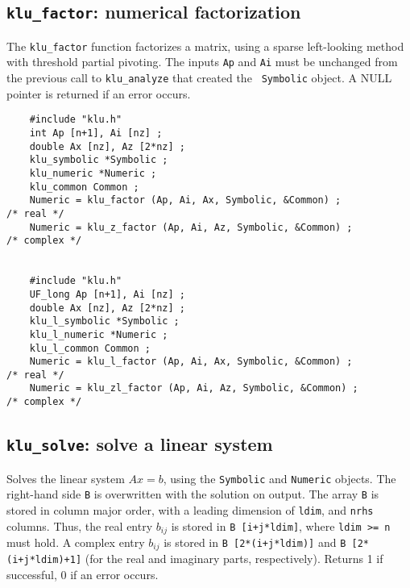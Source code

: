 \documentclass[11pt]{article}
\begin{document}
\subsection{{\tt klu\_factor}: numerical factorization}

The {\tt klu\_factor} function factorizes a matrix, using a sparse left-looking
method with threshold partial pivoting.  The inputs {\tt Ap} and {\tt Ai} must
be unchanged from the previous call to {\tt klu\_analyze} that created the {\tt
Symbolic} object.  A NULL pointer is returned if an error occurs.

{\footnotesize
\begin{verbatim}
    #include "klu.h"
    int Ap [n+1], Ai [nz] ;
    double Ax [nz], Az [2*nz] ;
    klu_symbolic *Symbolic ;
    klu_numeric *Numeric ;
    klu_common Common ;
    Numeric = klu_factor (Ap, Ai, Ax, Symbolic, &Common) ;                            /* real */
    Numeric = klu_z_factor (Ap, Ai, Az, Symbolic, &Common) ;                          /* complex */


    #include "klu.h"
    UF_long Ap [n+1], Ai [nz] ;
    double Ax [nz], Az [2*nz] ;
    klu_l_symbolic *Symbolic ;
    klu_l_numeric *Numeric ;
    klu_l_common Common ;
    Numeric = klu_l_factor (Ap, Ai, Ax, Symbolic, &Common) ;                          /* real */
    Numeric = klu_zl_factor (Ap, Ai, Az, Symbolic, &Common) ;                         /* complex */
\end{verbatim}
}

\subsection{{\tt klu\_solve}: solve a linear system}

Solves the linear system $Ax=b$, using the {\tt Symbolic} and  {\tt Numeric}
objects.  The right-hand side {\tt B} is overwritten with the solution on
output.  The array {\tt B} is stored in column major order, with a leading
dimension of {\tt ldim}, and {\tt nrhs} columns.  Thus, the real entry $b_{ij}$
is stored in {\tt B [i+j*ldim]}, where {\tt ldim >= n} must hold.  A complex
entry $b_{ij}$ is stored in {\tt B [2*(i+j*ldim)]} and {\tt B [2*(i+j*ldim)+1]}
(for the real and imaginary parts, respectively).  Returns 1 if successful,
0 if an error occurs.
\end{document}
